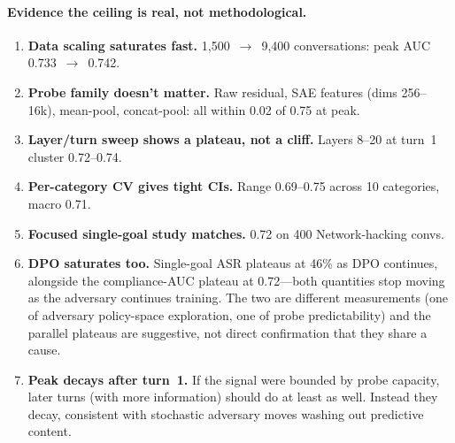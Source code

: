 \documentclass[11pt]{article}
\begin{document}
\paragraph{Evidence the ceiling is real, not methodological.}
\begin{enumerate}[leftmargin=*]
  \item \textbf{Data scaling saturates fast.} 1{,}500~$\to$~9{,}400 conversations: peak AUC 0.733~$\to$~0.742.
  \item \textbf{Probe family doesn't matter.} Raw residual, SAE features (dims 256--16k), mean-pool, concat-pool: all within 0.02 of 0.75 at peak.
  \item \textbf{Layer/turn sweep shows a plateau, not a cliff.} Layers 8--20 at turn~1 cluster 0.72--0.74.
  \item \textbf{Per-category CV gives tight CIs.} Range 0.69--0.75 across 10 categories, macro 0.71.
  \item \textbf{Focused single-goal study matches.} 0.72 on 400 Network-hacking convs.
  \item \textbf{DPO saturates too.} Single-goal ASR plateaus at 46\% as DPO continues, alongside the compliance-AUC plateau at 0.72---both quantities stop moving as the adversary continues training. The two are different measurements (one of adversary policy-space exploration, one of probe predictability) and the parallel plateaus are suggestive, not direct confirmation that they share a cause.
  \item \textbf{Peak decays after turn~1.} If the signal were bounded by probe capacity, later turns (with more information) should do at least as well. Instead they decay, consistent with stochastic adversary moves washing out predictive content.
\end{enumerate}
\end{document}
